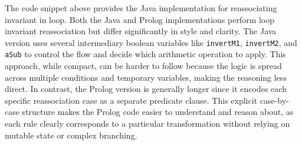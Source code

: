 The code snippet above provides the Java implementation for reassociating invariant in loop.
Both the Java and Prolog implementations perform loop invariant reassociation but differ significantly in style and clarity. The Java version uses several intermediary boolean variables like \texttt{invertM1}, \texttt{invertM2}, and \texttt{aSub} to control the flow and decide which arithmetic operation to apply. This approach, while compact, can be harder to follow because the logic is spread across multiple conditions and temporary variables, making the reasoning less direct. In contrast, the Prolog version is generally longer since it encodes each specific reassociation case as a separate predicate clause. This explicit case-by-case structure makes the Prolog code easier to understand and reason about, as each rule clearly corresponds to a particular transformation without relying on mutable state or complex branching.